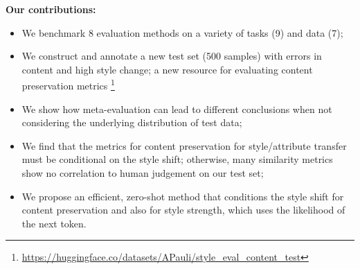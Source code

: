 \textbf{Our contributions:}
\begin{itemize}[noitemsep,nolistsep]
\item We benchmark 8 evaluation methods on a variety of tasks (9) and data (7);
\item We construct and annotate a new test set (500 samples) with errors in content and high style change; a new resource for evaluating content preservation metrics \footnote{\url{https://huggingface.co/datasets/APauli/style_eval_content_test}}
\item We show how meta-evaluation can lead to different conclusions when not considering the underlying distribution of test data;
\item We find that the metrics for content preservation for style/attribute transfer must be conditional on the style shift; otherwise, many similarity metrics show no correlation to human judgement on our test set; 
\item We propose an efficient, zero-shot method that conditions the style shift for content preservation and also for style strength, which uses the likelihood of the next token.   
\end{itemize}

